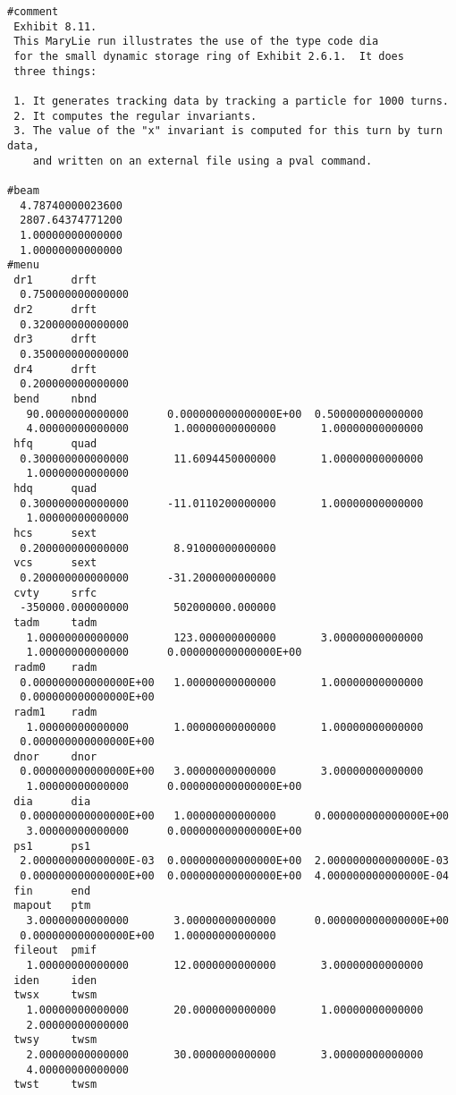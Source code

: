 \vspace{5mm}
\begin{footnotesize}
\begin{verbatim}
#comment
 Exhibit 8.11.
 This MaryLie run illustrates the use of the type code dia
 for the small dynamic storage ring of Exhibit 2.6.1.  It does
 three things:

 1. It generates tracking data by tracking a particle for 1000 turns.
 2. It computes the regular invariants.
 3. The value of the "x" invariant is computed for this turn by turn data,
    and written on an external file using a pval command.

#beam
  4.78740000023600
  2807.64374771200
  1.00000000000000
  1.00000000000000
#menu
 dr1      drft
  0.750000000000000
 dr2      drft
  0.320000000000000
 dr3      drft
  0.350000000000000
 dr4      drft
  0.200000000000000
 bend     nbnd
   90.0000000000000      0.000000000000000E+00  0.500000000000000
   4.00000000000000       1.00000000000000       1.00000000000000
 hfq      quad
  0.300000000000000       11.6094450000000       1.00000000000000
   1.00000000000000
 hdq      quad
  0.300000000000000      -11.0110200000000       1.00000000000000
   1.00000000000000
 hcs      sext
  0.200000000000000       8.91000000000000
 vcs      sext
  0.200000000000000      -31.2000000000000
 cvty     srfc
  -350000.000000000       502000000.000000
 tadm     tadm
   1.00000000000000       123.000000000000       3.00000000000000
   1.00000000000000      0.000000000000000E+00
 radm0    radm
  0.000000000000000E+00   1.00000000000000       1.00000000000000
  0.000000000000000E+00
 radm1    radm
   1.00000000000000       1.00000000000000       1.00000000000000
  0.000000000000000E+00
 dnor     dnor
  0.000000000000000E+00   3.00000000000000       3.00000000000000
   1.00000000000000      0.000000000000000E+00
 dia      dia
  0.000000000000000E+00   1.00000000000000      0.000000000000000E+00
   3.00000000000000      0.000000000000000E+00
 ps1      ps1
  2.000000000000000E-03  0.000000000000000E+00  2.000000000000000E-03
  0.000000000000000E+00  0.000000000000000E+00  4.000000000000000E-04
 fin      end
 mapout   ptm
   3.00000000000000       3.00000000000000      0.000000000000000E+00
  0.000000000000000E+00   1.00000000000000
 fileout  pmif
   1.00000000000000       12.0000000000000       3.00000000000000
 iden     iden
 twsx     twsm
   1.00000000000000       20.0000000000000       1.00000000000000
   2.00000000000000
 twsy     twsm
   2.00000000000000       30.0000000000000       3.00000000000000
   4.00000000000000
 twst     twsm

\end{verbatim}
\end{footnotesize}
